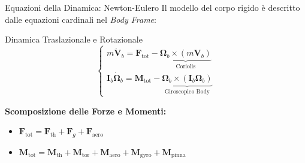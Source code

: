 \documentclass[aspectratio=169]{beamer} %
\begin{document}
\begin{frame}{Equazioni della Dinamica: Newton-Eulero}
    Il modello del corpo rigido è descritto dalle equazioni cardinali nel \textit{Body Frame}:
    
    \vspace{0.5cm}
    \begin{block}{Dinamica Traslazionale e Rotazionale}
    \begin{equation}
        \begin{cases}
            m \bm{\dot{V}}_b = \bm{F}_{\text{tot}} - \underbrace{\bm{\Omega}_b \times (m \bm{V}_b)}_{\text{Coriolis}} \\
            \mathbf{I}_b \bm{\dot{\Omega}}_b = \bm{M}_{\text{tot}} - \underbrace{\bm{\Omega}_b \times (\mathbf{I}_b \bm{\Omega}_b)}_{\text{Giroscopico Body}}
        \end{cases}
    \end{equation}
    \end{block}
    
    \vspace{0.5cm}
    \textbf{Scomposizione delle Forze e Momenti:}
    \begin{itemize}
        \item $\bm{F}_{\text{tot}} = \bm{F}_{\text{th}} + \bm{F}_g + \bm{F}_{\text{aero}}$
        \item $\bm{M}_{\text{tot}} = \bm{M}_{\text{th}} + \bm{M}_{\text{tor}} + \bm{M}_{\text{aero}} + \bm{M}_{\text{gyro}} + \bm{M}_{\text{pinna}}$
    \end{itemize}
\end{frame}
\end{document}

